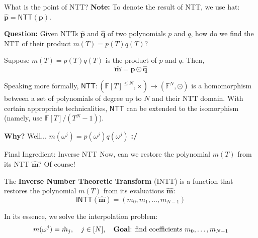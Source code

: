 \documentclass{zkdl-presentation-template}
\begin{document}
    \begin{frame}{What is the point of NTT?}
        \textcolor{oc-green-8}{\textbf{Note:}} To denote the result of NTT, we use hat: $\hat{\mathbf{p}} = \mathsf{NTT}(\mathbf{p})$.
        \pause

        \textcolor{oc-pink-7}{\textbf{Question:}} Given NTTs $\hat{\mathbf{p}}$ and $\hat{\mathbf{q}}$ of two polynomials $p$ and $q$,
        how do we find the NTT of their product $m(T) = p(T)q(T)$?
        \pause

        \begin{proposition}
            Suppose $m(T) = p(T)q(T)$ is the product of $p$ and $q$. Then,
            \begin{equation*}
                \hat{\mathbf{m}} = \hat{\mathbf{p}} \odot \hat{\mathbf{q}}
            \end{equation*}
            \pause

            Speaking more formally, $\mathsf{NTT}: (\mathbb{F}[T]^{\leq N},\times) \to (\mathbb{F}^N, \odot)$ is
            a homomorphism between a set of polynomials of degree up to $N$ and their NTT domain. With certain
            appropriate technicalities, $\mathsf{NTT}$ can be extended to the isomorphism (namely, use $\mathbb{F}[T] / (T^N-1)$).
        \end{proposition}
        \pause

        \textcolor{oc-blue-7}{\textbf{Why?}}\pause{} Well... $m(\omega^j)=p(\omega^j)q(\omega^j)$ \hspace{20px} \textbf{:/}
    \end{frame}

    \begin{frame}{Final Ingredient: Inverse NTT}
        Now, can we restore the polynomial $m(T)$ from its NTT $\hat{\mathbf{m}}$?\pause{} Of course!

        \begin{definition}
            The \textbf{Inverse Number Theoretic Transform} (INTT) is a function
            that restores the polynomial $m(T)$ from its evaluations $\hat{\mathbf{m}}$:
            \begin{equation*}
                \mathsf{INTT}(\hat{\mathbf{m}}) = (m_0,m_1,\dots,m_{N-1})
            \end{equation*}
        \end{definition}
        \pause

        In its essence, we solve the interpolation problem:
        \begin{equation*}
            m(\omega^j) = \hat{m}_j, \quad j \in [N], \quad \text{\textbf{Goal}: find coefficients $m_0,\dots,m_{N-1}$}
        \end{equation*}
    \end{frame}
\end{document}
